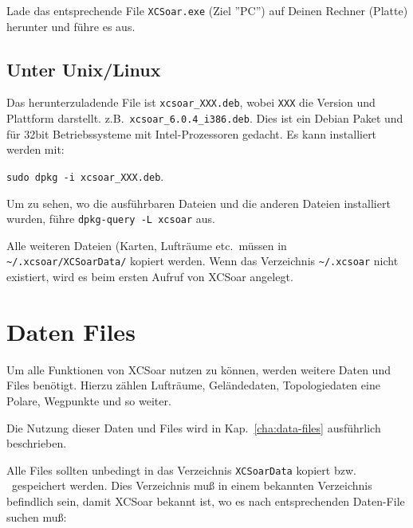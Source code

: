 Lade das entsprechende File \verb|XCSoar.exe| (Ziel ''PC'') auf Deinen Rechner (Platte) herunter und führe es aus.


\subsection*{Unter Unix/Linux}

Das herunterzuladende File ist \verb|xcsoar_XXX.deb|, wobei \verb|XXX| die Version und Plattform darstellt.  
z.B.\ \verb|xcsoar_6.0.4_i386.deb|. Dies ist ein Debian Paket und für 32bit Betriebssysteme mit Intel-Prozessoren gedacht.
Es kann installiert werden mit:
\begin{center}
\verb|sudo dpkg -i xcsoar_XXX.deb|.
\end{center}
Um zu sehen, wo die ausführbaren Dateien und die anderen Dateien installiert wurden, führe \verb|dpkg-query -L xcsoar| 
aus. 

Alle weiteren Dateien (Karten, Lufträume etc.\ müssen in \verb|~/.xcsoar/XCSoarData/| kopiert werden.
Wenn das Verzeichnis \verb|~/.xcsoar| nicht existiert, wird es beim ersten Aufruf von {\textsf  XCSoar} angelegt.


\section{Daten Files}\label{InstallationDatenfiles}

Um alle Funktionen von {\textsf  XCSoar} nutzen zu können, werden weitere Daten und Files benötigt.
Hierzu zählen Lufträume, Geländedaten, Topologiedaten eine Polare, Wegpunkte und so weiter. 


Die Nutzung dieser Daten und Files wird in Kap.~\ref{cha:data-files} ausführlich beschrieben. 

Alle Files sollten unbedingt in das Verzeichnis \texttt{XCSoarData} kopiert bzw. \ gespeichert werden. 
Dies Verzeichnis muß  in einem bekannten Verzeichnis befindlich sein, damit {\textsf  XCSoar} bekannt ist, wo es nach entsprechenden 
Daten-File suchen muß: 

